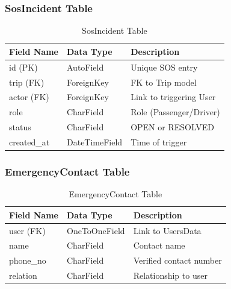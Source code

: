 \subsubsection{SosIncident Table}
\begin{table}[H]
\centering
\caption{SosIncident Table}
\renewcommand{\arraystretch}{1.5}
\begin{tabular}{|p{3cm}|p{3.5cm}|p{7cm}|}
\hline
\textbf{Field Name} & \textbf{Data Type} & \textbf{Description} \\
\hline
id (PK) & AutoField & Unique SOS entry \\
\hline
trip (FK) & ForeignKey & FK to Trip model \\
\hline
actor (FK) & ForeignKey & Link to triggering User \\
\hline
role & CharField & Role (Passenger/Driver) \\
\hline
status & CharField & OPEN or RESOLVED \\
\hline
created\_at & DateTimeField & Time of trigger \\
\hline
\end{tabular}
\end{table}

\subsubsection{EmergencyContact Table}
\begin{table}[H]
\centering
\caption{EmergencyContact Table}
\renewcommand{\arraystretch}{1.5}
\begin{tabular}{|p{3cm}|p{3.5cm}|p{7cm}|}
\hline
\textbf{Field Name} & \textbf{Data Type} & \textbf{Description} \\
\hline
user (FK) & OneToOneField & Link to UsersData \\
\hline
name & CharField & Contact name \\
\hline
phone\_no & CharField & Verified contact number \\
\hline
relation & CharField & Relationship to user \\
\hline
\end{tabular}
\end{table}

